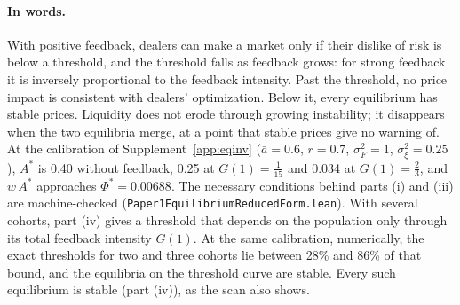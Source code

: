 \paragraph{In words.} With positive feedback, dealers can make a market only if their dislike of risk is below a threshold, and the threshold falls as feedback grows: for strong feedback it is inversely proportional to the feedback intensity. Past the threshold, no price impact is consistent with dealers' optimization. Below it, every equilibrium has stable prices. Liquidity does not erode through growing instability; it disappears when the two equilibria merge, at a point that stable prices give no warning of. At the calibration of Supplement~\ref{app:eqinv} ($\bar a=0.6$, $r=0.7$, $\sigma_F^2=1$, $\sigma_\xi^2=0.25$), $A^*$ is 0.40 without feedback, 0.25 at $G(1)=\tfrac1{15}$ and 0.034 at $G(1)=\tfrac23$, and $w\,A^*$ approaches $\Phi^*=0.00688$. The necessary conditions behind parts (i) and (iii) are machine-checked (\nolinkurl{Paper1EquilibriumReducedForm.lean}). With several cohorts, part (iv) gives a threshold that depends on the population only through its total feedback intensity $G(1)$. At the same calibration, numerically, the exact thresholds for two and three cohorts lie between 28\% and 86\% of that bound, and the equilibria on the threshold curve are stable. Every such equilibrium is stable (part (iv)), as the scan also shows.



